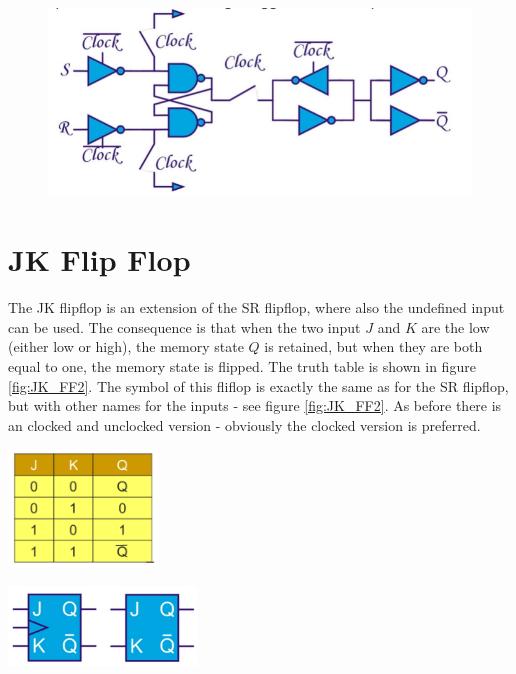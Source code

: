 \begin{figure}[h!]
	\centering
	\includegraphics[width=12cm]{figures/ch17/edge_trigger4.jpg}
	\caption{}
	\label{fig:edge_trigger4}		
\end{figure}

\section{JK Flip Flop}

The JK flipflop is an extension of the SR flipflop, where also the undefined input can be used. The consequence is that when the two input $J$ and $K$ are the low (either low or high), the memory state $Q$ is retained, but when they are both equal to one, the memory state is flipped. The truth table is shown in figure \ref{fig:JK_FF2}. The symbol of this fliflop is exactly the same as for the SR flipflop, but with other names for the inputs - see figure \ref{fig:JK_FF2}. As before there is an clocked and unclocked version - obviously the clocked version is preferred.

\begin{minipage}{.5\textwidth}
	\centering
	\includegraphics[width=4cm]{figures/ch17/JK_FF2.jpg}
	\label{fig:JK_FF2}
\end{minipage}%
\begin{minipage}{.5\textwidth}
	\centering
	\includegraphics[width=5cm]{figures/ch17/JK_FF1.jpg}
	\label{fig:JK_FF1}
\end{minipage}

